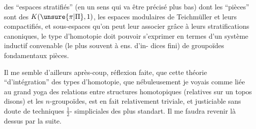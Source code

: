 des ``espaces stratifiés'' (en un sens qui
va être précisé plus bas) dont les
``pièces'' sont des $K(\unsure{\pi|\Pi},1)$, 
les espaces modulaires de Teichmüller
et leurs compactifiés, et  sous-espaces
qu'on peut leur associer grâce à leurs
stratifications canoniques, le type
d'homotopie doit pouvoir s'exprimer
en termes d'un système inductif
convenable (le plus souvent à ens. d'in-
dices fini) de groupoïdes fondamentaux
 pièces.

Il me semble d'ailleurs après-coup,
réflexion faite, que cette théorie ``d'intégration''
des types d'homotopie, que nébuleusement
je voyais comme liée au grand yoga des
relations entre structures homotopiques (relatives
sur un topos disons) et les $n$-groupoïdes,
est en fait relativement triviale, et
justiciable sans doute de techniques $\frac12$-
simpliciales des plus standart. Il me
faudra revenir là dessus par la suite.

